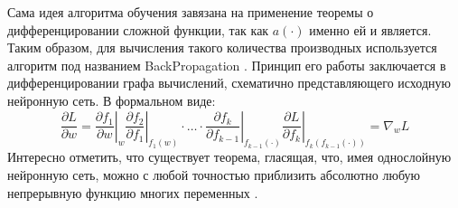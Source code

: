 Сама идея алгоритма обучения завязана на применение теоремы о дифференцировании сложной функции, так как $a(\cdot)$ именно ей и является. Таким образом, для вычисления такого количества производных используется алгоритм под названием BackPropagation \cite{linnainmaa1970representation}. Принцип его работы заключается в дифференцировании графа вычислений, схематично представляющего исходную нейронную сеть. В формальном виде:
\begin{equation}
	\frac{\partial L}{\partial w} = \left. \frac{\partial f_1}{\partial w} \right\rvert_w \left. \frac{\partial f_2}{\partial f_1} \right\rvert_{f_1(w)} \cdot \ldots \cdot \left. \frac{\partial f_k}{\partial f_{k - 1}} \right\rvert_{f_{k - 1}(\cdot)} \left. \frac{\partial L}{\partial f_k} \right\rvert_{f_k\left(f_{k - 1}(\cdot)\right)} = \nabla_w L
\end{equation}
Интересно отметить, что существует теорема, гласящая, что, имея однослойную нейронную сеть, можно с любой точностью приблизить абсолютно любую непрерывную функцию многих переменных \cite{cybenko1989approximation}.

